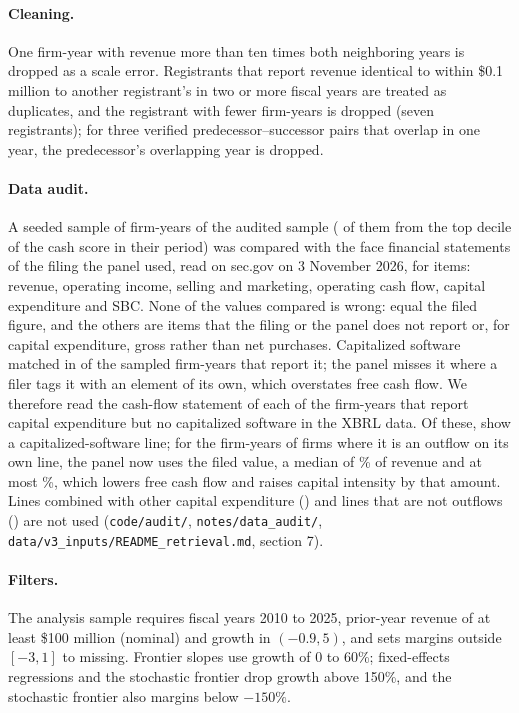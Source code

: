 \paragraph{Cleaning.} One firm-year with revenue more than ten times both neighboring years is dropped as a scale error. Registrants that report revenue identical to within \$0.1 million to another registrant's in two or more fiscal years are treated as duplicates, and the registrant with fewer firm-years is dropped (seven registrants); for three verified predecessor--successor pairs that overlap in one year, the predecessor's overlapping year is dropped.

\paragraph{Data audit.} A seeded sample of \AuditFirmYears{} firm-years of the audited sample (\AuditTopN{} of them from the top decile of the cash score in their period) was compared with the face financial statements of the filing the panel used, read on sec.gov on 3 November 2026, for \AuditItems{} items: revenue, operating income, selling and marketing, operating cash flow, capital expenditure and SBC. None of the \AuditValues{} values compared is wrong: \AuditEqual{} equal the filed figure, and the others are items that the filing or the panel does not report or, for capital expenditure, gross rather than net purchases. Capitalized software matched in \AuditCapswMatch{} of the \AuditCapswN{} sampled firm-years that report it; the panel misses it where a filer tags it with an element of its own, which overstates free cash flow. We therefore read the cash-flow statement of each of the \CapswScanned{} firm-years that report capital expenditure but no capitalized software in the XBRL data. Of these, \CapswCandidates{} show a capitalized-software line; for the \CapswKept{} firm-years of \CapswKeptFirms{} firms where it is an outflow on its own line, the panel now uses the filed value, a median of \CapswMedRev\% of revenue and at most \CapswMaxRev\%, which lowers free cash flow and raises capital intensity by that amount. Lines combined with other capital expenditure (\CapswCombined) and lines that are not outflows (\CapswNotOutflow) are not used (\texttt{code/audit/}, \texttt{notes/data\_audit/}, \texttt{data/v3\_inputs/README\_retrieval.md}, section 7).

\paragraph{Filters.} The analysis sample requires fiscal years 2010 to 2025, prior-year revenue of at least \$100 million (nominal) and growth in $(-0.9,5)$, and sets margins outside $[-3,1]$ to missing. Frontier slopes use growth of 0 to 60\%; fixed-effects regressions and the stochastic frontier drop growth above 150\%, and the stochastic frontier also margins below $-150\%$.

